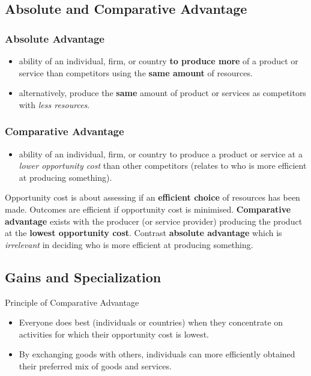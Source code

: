\subsection{Absolute and Comparative Advantage}
\subsubsection{Absolute Advantage}
\begin{itemize}
	\item ability of an individual, firm, or country \textbf{to produce more} of a product or service than competitors using the \textbf{same amount} of resources.
	\item alternatively, produce the \textbf{same} amount of product or services as competitors with \textit{less resources}.
\end{itemize}
\subsubsection{Comparative Advantage}
\begin{itemize}
	\item ability of an individual, firm, or country to produce a product or service at a \textit{lower opportunity cost} than other competitors (relates to who is more efficient at producing something).
\end{itemize}
Opportunity cost is about assessing if an \textbf{efficient choice} of resources has been made. Outcomes are efficient if opportunity cost is minimised. \textbf{Comparative advantage} exists with the producer (or service provider) producing the product at the \textbf{lowest opportunity cost}. Contrast \textbf{absolute advantage} which is \textit{irrelevant} in deciding who is more efficient at producing something.

\subsection{Gains and Specialization}
\begin{note}{Principle of Comparative Advantage}
	\begin{itemize}
		\item Everyone does best (individuals or countries) when they concentrate on activities for which their opportunity cost is lowest.
		\item By exchanging goods with others, individuals can more efficiently obtained their preferred mix of goods and services.
	\end{itemize}
\end{note}

